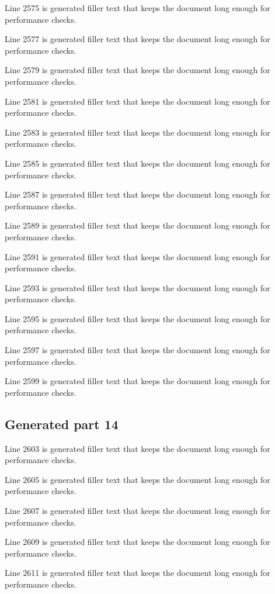 Line 2575 is generated filler text that keeps the document long enough for performance checks.

Line 2577 is generated filler text that keeps the document long enough for performance checks.

Line 2579 is generated filler text that keeps the document long enough for performance checks.

Line 2581 is generated filler text that keeps the document long enough for performance checks.

Line 2583 is generated filler text that keeps the document long enough for performance checks.

Line 2585 is generated filler text that keeps the document long enough for performance checks.

Line 2587 is generated filler text that keeps the document long enough for performance checks.

Line 2589 is generated filler text that keeps the document long enough for performance checks.

Line 2591 is generated filler text that keeps the document long enough for performance checks.

Line 2593 is generated filler text that keeps the document long enough for performance checks.

Line 2595 is generated filler text that keeps the document long enough for performance checks.

Line 2597 is generated filler text that keeps the document long enough for performance checks.

Line 2599 is generated filler text that keeps the document long enough for performance checks.

\subsection{Generated part 14}

Line 2603 is generated filler text that keeps the document long enough for performance checks.

Line 2605 is generated filler text that keeps the document long enough for performance checks.

Line 2607 is generated filler text that keeps the document long enough for performance checks.

Line 2609 is generated filler text that keeps the document long enough for performance checks.

Line 2611 is generated filler text that keeps the document long enough for performance checks.

